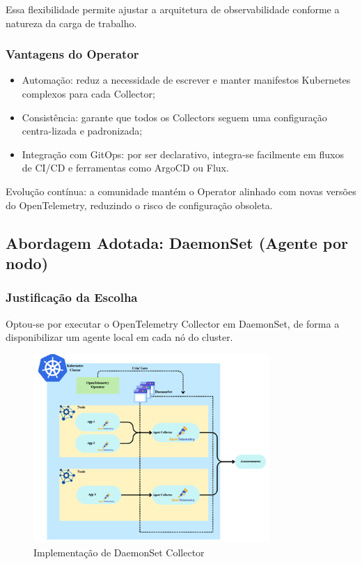 Essa flexibilidade permite ajustar a arquitetura de observabilidade conforme a natureza da carga de trabalho.

\subsubsection{Vantagens do Operator}

\begin{itemize}
    \item Automação: reduz a necessidade de escrever e manter manifestos Kubernetes complexos para cada Collector;
    \item Consistência: garante que todos os Collectors seguem uma configuração centra-lizada e padronizada;
    \item Integração com GitOps: por ser declarativo, integra-se facilmente em fluxos de CI/CD e ferramentas como ArgoCD ou Flux.
\end{itemize}

Evolução contínua: a comunidade mantém o Operator alinhado com novas versões do OpenTelemetry, reduzindo o risco de configuração obsoleta.

\subsection{Abordagem Adotada: DaemonSet (Agente por nodo)}

\subsubsection{Justificação da Escolha}

Optou-se por executar o OpenTelemetry Collector em DaemonSet, de forma a disponibilizar um agente local em cada nó do cluster. 

\begin{figure}[h]
    \centering
    \includegraphics[width=0.8\textwidth]{images/Diagramas/daemonset_collector.png}
    \caption{Implementação de DaemonSet Collector}
\end{figure}

